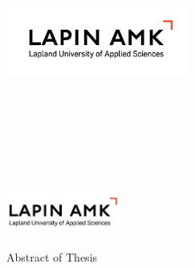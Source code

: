 




\pagestyle{empty}  %

\begin{center}
\includegraphics[width=6cm]{UAS_Logo}
\end{center}

\vspace{8.5cm}
\begin{center}
\fontsize{16pt}{1pt}\selectfont
\otsikko \\ 
\vspace{0.7cm}
\fontsize{14pt}{1pt}\selectfont
\alaotsikko
\end{center}

\vspace{5cm}
\begin{center}
\taustaprojekti\\
\vspace{0.6cm}
\tekija \\
\vspace{0.6cm}
\opinnaytetyo \\
\koulutus\\
\tutkintonimike
\end{center}

\begin{center}\fontsize{16pt}{1pt}\selectfont
\aika
\end{center}


\newpage\null
\pagestyle{empty}  %

\begin{minipage}{0.22\textwidth}
\includegraphics[width=3.7cm]{ylatunnisteLogo}
\end{minipage}
\begin{minipage}{0.6\textwidth}\raggedleft
Abstract of Thesis\\
\end{minipage}

